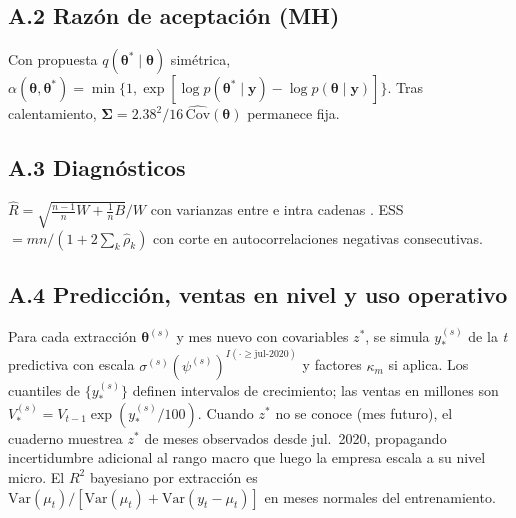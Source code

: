 \documentclass[twocolumn,10pt]{article}
\begin{document}
\subsection*{A.2 Razón de aceptación (MH)}
Con propuesta $q(\boldsymbol{\theta}^*\mid\boldsymbol{\theta})$ simétrica,
$\alpha(\boldsymbol{\theta},\boldsymbol{\theta}^*)=\min\{1,\exp[\log p(\boldsymbol{\theta}^*\mid\mathbf{y})-\log p(\boldsymbol{\theta}\mid\mathbf{y})]\}$.
Tras calentamiento, $\boldsymbol{\Sigma}=2.38^2/16\,\widehat{\mathrm{Cov}}(\boldsymbol{\theta})$ permanece fija.

\subsection*{A.3 Diagnósticos}
$\hat R=\sqrt{\frac{n-1}{n}W+\frac{1}{n}B}\big/ W$ con varianzas entre e intra cadenas \citep{vehtari2021}. ESS $=mn/(1+2\sum_k\hat\rho_k)$ con corte en autocorrelaciones negativas consecutivas.

\subsection*{A.4 Predicción, ventas en nivel y uso operativo}
Para cada extracción $\boldsymbol{\theta}^{(s)}$ y mes nuevo con covariables $z^*$, se simula $y_*^{(s)}$ de la \textit{t} predictiva con escala $\sigma^{(s)}(\psi^{(s)})^{I(\cdot\ge\text{jul-2020})}$ y factores $\kappa_m$ si aplica. Los cuantiles de $\{y_*^{(s)}\}$ definen intervalos de crecimiento; las ventas en millones son $V_*^{(s)}=V_{t-1}\exp(y_*^{(s)}/100)$. Cuando $z^*$ no se conoce (mes futuro), el cuaderno muestrea $z^*$ de meses observados desde jul.\ 2020, propagando incertidumbre adicional al rango macro que luego la empresa escala a su nivel micro. El $R^2$ bayesiano por extracción es $\mathrm{Var}(\mu_t)/[\mathrm{Var}(\mu_t)+\mathrm{Var}(y_t-\mu_t)]$ en meses normales del entrenamiento.

\twocolumn


\end{document}
